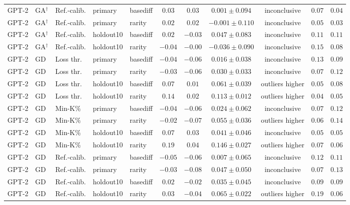 \begin{table}[t]
\begin{tabular*}{\textwidth}{@{\extracolsep{\fill}}lllllcccccc@{}}
GPT-2 & GA$^{\dagger}$ & Ref.-calib. & primary & basediff & $0.03$ & $0.03$ & $0.001 \pm 0.094$ & inconclusive & $0.07$ & $0.04$ \\
GPT-2 & GA$^{\dagger}$ & Ref.-calib. & primary & rarity & $0.02$ & $0.02$ & $-0.001 \pm 0.110$ & inconclusive & $0.05$ & $0.03$ \\
GPT-2 & GA$^{\dagger}$ & Ref.-calib. & holdout10 & basediff & $0.02$ & $-0.03$ & $0.047 \pm 0.083$ & inconclusive & $0.11$ & $0.11$ \\
GPT-2 & GA$^{\dagger}$ & Ref.-calib. & holdout10 & rarity & $-0.04$ & $-0.00$ & $-0.036 \pm 0.090$ & inconclusive & $0.15$ & $0.08$ \\
GPT-2 & GD & Loss thr. & primary & basediff & $-0.04$ & $-0.06$ & $0.016 \pm 0.038$ & inconclusive & $0.13$ & $0.09$ \\
GPT-2 & GD & Loss thr. & primary & rarity & $-0.03$ & $-0.06$ & $0.030 \pm 0.033$ & inconclusive & $0.07$ & $0.12$ \\
GPT-2 & GD & Loss thr. & holdout10 & basediff & $0.07$ & $0.01$ & $0.061 \pm 0.039$ & outliers higher & $0.05$ & $0.08$ \\
GPT-2 & GD & Loss thr. & holdout10 & rarity & $0.14$ & $0.02$ & $0.113 \pm 0.012$ & outliers higher & $0.04$ & $0.05$ \\
GPT-2 & GD & Min-K\% & primary & basediff & $-0.04$ & $-0.06$ & $0.024 \pm 0.062$ & inconclusive & $0.07$ & $0.12$ \\
GPT-2 & GD & Min-K\% & primary & rarity & $-0.02$ & $-0.07$ & $0.055 \pm 0.036$ & outliers higher & $0.06$ & $0.14$ \\
GPT-2 & GD & Min-K\% & holdout10 & basediff & $0.07$ & $0.03$ & $0.041 \pm 0.046$ & inconclusive & $0.05$ & $0.05$ \\
GPT-2 & GD & Min-K\% & holdout10 & rarity & $0.19$ & $0.04$ & $0.146 \pm 0.027$ & outliers higher & $0.07$ & $0.06$ \\
GPT-2 & GD & Ref.-calib. & primary & basediff & $-0.05$ & $-0.06$ & $0.007 \pm 0.065$ & inconclusive & $0.12$ & $0.11$ \\
GPT-2 & GD & Ref.-calib. & primary & rarity & $-0.03$ & $-0.08$ & $0.047 \pm 0.050$ & inconclusive & $0.07$ & $0.13$ \\
GPT-2 & GD & Ref.-calib. & holdout10 & basediff & $0.02$ & $-0.02$ & $0.035 \pm 0.045$ & inconclusive & $0.09$ & $0.09$ \\
GPT-2 & GD & Ref.-calib. & holdout10 & rarity & $0.03$ & $-0.04$ & $0.065 \pm 0.022$ & outliers higher & $0.19$ & $0.06$ \\

\end{tabular*}
\end{table}
